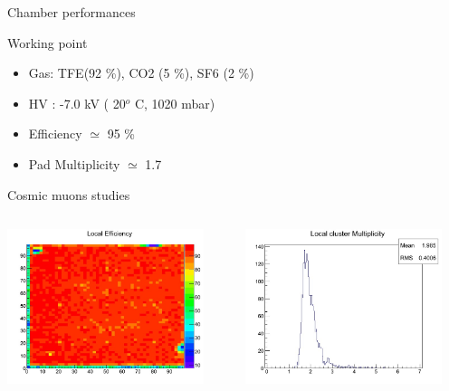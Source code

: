 \documentclass[10pt]{beamer}
\begin{document}
\begin{frame}{Chamber performances  }
  \begin{block}{Working point}
    \begin{itemize}
      \item Gas: TFE(92 \%), CO2 (5 \%), SF6 (2 \%)
      \item HV : -7.0 kV ( 20$^o$ C, 1020 mbar) 
      \item Efficiency $\simeq$ 95 \%
      \item Pad Multiplicity $\simeq$ 1.7
    \end{itemize}
  \end{block}
  \begin{block}{ Cosmic muons studies}
    \begin{columns}

      \begin{column}{0.5\textwidth}
        \centerline{\includegraphics[width=0.9\textwidth]{jpg/LocalEfficiency}}
      \end{column}
      \begin{column}{0.5\textwidth}
        \centerline{\includegraphics[width=0.9\textwidth]{jpg/LocalMultiplicity}}
      \end{column}
    \end{columns}
  \end{block}

\end{frame}
\end{document}
